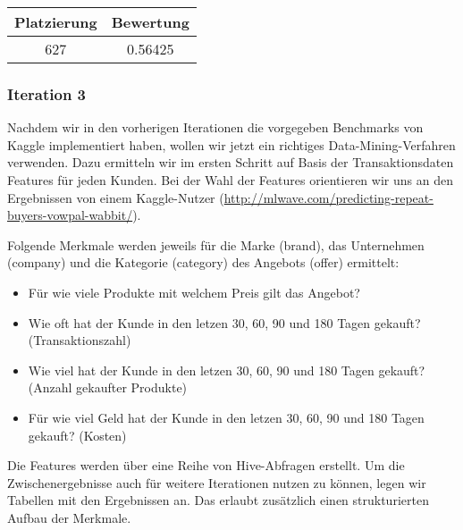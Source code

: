 \begin{tabular}{|c|c|}
	\hline \textbf{Platzierung} & \textbf{Bewertung} \\ 
	\hline 627 & 0.56425  \\ 
	\hline 
\end{tabular}

\subsubsection{Iteration 3}

Nachdem wir in den vorherigen Iterationen die vorgegeben Benchmarks von Kaggle implementiert haben,
wollen wir jetzt ein richtiges Data-Mining-Verfahren verwenden. Dazu ermitteln wir im ersten Schritt
auf Basis der Transaktionsdaten Features für jeden Kunden. Bei der Wahl der Features orientieren
wir uns an den Ergebnissen von einem Kaggle-Nutzer (\url{http://mlwave.com/predicting-repeat-buyers-vowpal-wabbit/}).

Folgende Merkmale werden jeweils für die Marke (brand), das Unternehmen (company) und die Kategorie (category)
des Angebots (offer) ermittelt:
\begin{itemize}
	\item Für wie viele Produkte mit welchem Preis gilt das Angebot?
	\item Wie oft hat der Kunde in den letzen 30, 60, 90 und 180 Tagen gekauft? (Transaktionszahl)
	\item Wie viel hat der Kunde in den letzen 30, 60, 90 und 180 Tagen gekauft? (Anzahl gekaufter Produkte)
	\item Für wie viel Geld hat der Kunde in den letzen 30, 60, 90 und 180 Tagen gekauft? (Kosten)
\end{itemize}

Die Features werden über eine Reihe von Hive-Abfragen erstellt. Um die Zwischenergebnisse auch für
weitere Iterationen nutzen zu können, legen wir Tabellen mit den Ergebnissen an. Das erlaubt zusätzlich
einen strukturierten Aufbau der Merkmale.

